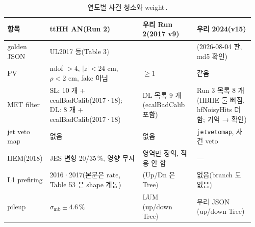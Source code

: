 \begin{table}[htbp]
\caption{연도별 사건 청소와 weight\,.}
\label{tab:objects-cleaning}
\centering\footnotesize
\begin{tabularx}{\textwidth}{@{}p{1.9cm}L L L@{}}
\toprule
항목 & ttHH AN(Run 2) & 우리 Run 2(2017 v9) & 우리 2024(v15) \\
\midrule
golden JSON & UL2017 등(Table 3) &  & (2026-08-04 판, md5 확인) \\
PV & ndof $>4$, $|z|<24$ cm, $\rho<2$ cm, fake 아님 &  $\geq 1$ & 같음 \\
MET filter & SL: 10 개 + ecalBadCalib(2017·18); DL: 8 개 + ecalBadCalib(2017·18) & DL 목록 9 개(ecalBadCalib 포함) & Run 3 목록 8 개(HBHE 둘 빠짐, hfNoisyHits 더함; 기억 → 확인) \\
jet veto map & 없음 & 없음 & \texttt{jetvetomap}, 사건 veto \\
HEM(2018) & JES 변형 20/35\,\%, 영향 무시 & 영역만 정의, 적용 안 함 & --- \\
L1 prefiring & 2016·2017(본문은 rate, Table 53 은 shape 계통) & (Up/Dn 은 Tree) & 없음(branch 도 없음) \\
pileup & $\sigma_\text{mb}\pm4.6\,\%$ & LUM (up/down Tree) & 우리 JSON (up/down Tree) \\
\bottomrule
\end{tabularx}
\end{table}

